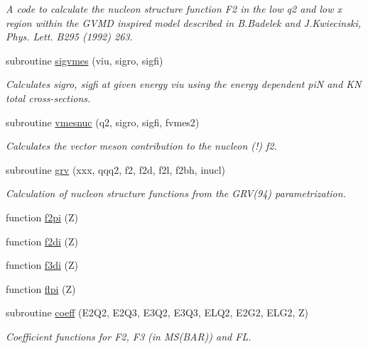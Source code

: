 \begin{DoxyCompactItemize}
\begin{DoxyCompactList}\small\item\em A code to calculate the nucleon structure function F2 in the low q2 and low x region within the G\+V\+MD inspired model described in B.\+Badelek and J.\+Kwiecinski, Phys. Lett. B295 (1992) 263. \end{DoxyCompactList}\item 
subroutine \hyperlink{djangoh__h_8f_a6b980956c078e121e1a7215a2033efad}{sigvmes} (viu, sigro, sigfi)
\begin{DoxyCompactList}\small\item\em Calculates sigro, sigfi at given energy viu using the energy dependent piN and KN total cross-\/sections. \end{DoxyCompactList}\item 
subroutine \hyperlink{djangoh__h_8f_a77d015292013fd43ec8c22102bd3f550}{vmesnuc} (q2, sigro, sigfi, fvmes2)
\begin{DoxyCompactList}\small\item\em Calculates the vector meson contribution to the nucleon (!) f2. \end{DoxyCompactList}\item 
subroutine \hyperlink{djangoh__h_8f_a8a8a8c7d09de0774b4df23c2a478b0e9}{grv} (xxx, qqq2, f2, f2d, f2l, f2bh, inucl)
\begin{DoxyCompactList}\small\item\em Calculation of nucleon structure functions from the G\+RV(\textquotesingle{}94\textquotesingle{}) parametrization. \end{DoxyCompactList}\item 
function \hyperlink{djangoh__h_8f_a5406252e31a444cc5948a76a2fc12b7a}{f2pi} (Z)
\item 
function \hyperlink{djangoh__h_8f_a66aa9c3ae1cb33ef750c36b69352492f}{f2di} (Z)
\item 
function \hyperlink{djangoh__h_8f_a18a337c35a522fe63139387b73cd467d}{f3di} (Z)
\item 
function \hyperlink{djangoh__h_8f_a2d0d6b8e392b26e62adbdda4455979c4}{flpi} (Z)
\item 
subroutine \hyperlink{djangoh__h_8f_a0f48ba14b638dc9f3dbffb7f5b8bca0b}{coeff} (E2\+Q2, E2\+Q3, E3\+Q2, E3\+Q3, E\+L\+Q2, E2\+G2, E\+L\+G2, Z)
\begin{DoxyCompactList}\small\item\em Coefficient functions for F2, F3 (in M\+S(\+B\+A\+R)) and FL. \end{DoxyCompactList}\item 

\end{DoxyCompactItemize}
